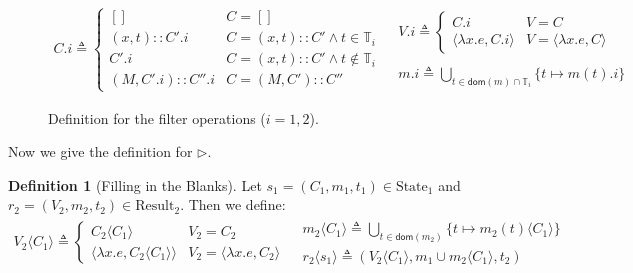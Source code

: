 \documentclass{article}
\theoremstyle{definition}
\newtheorem{definition}{Definition}[section]
\newcommand*{\cons}{::}
\newcommand*{\Time}{\mathbb{T}}
\newcommand*{\mem}{m}
\newcommand*{\State}{\text{State}}
\newcommand*{\Result}{\text{Result}}
\newcommand*{\inject}[2]{{#2}\langle{#1}\rangle}
\begin{document}
\begin{figure}[h!]
  \[
    \begin{array}{cc}
      C.i\triangleq
      \begin{cases}
        []                  & C=[]                                    \\
        (x,t)\cons C'.i     & C=(x,t)\cons C'\wedge t\in{\Time_i}     \\
        C'.i                & C=(x,t)\cons C'\wedge t\not\in{\Time_i} \\
        (M,C'.i)\cons C''.i & C=(M, C')\cons C''
      \end{cases} &
      \begin{array}{l}
        V.i\triangleq
        \begin{cases}
          C.i                           & V=C                           \\
          \langle\lambda x.e,C.i\rangle & V=\langle\lambda x.e,C\rangle
        \end{cases} \\ \\
        \mem.i\triangleq
        \displaystyle\bigcup_{t\in\mathsf{dom}(\mem)\cap\Time_i}\{t\mapsto \mem(t).i\}
      \end{array}
    \end{array}
  \]
  \caption{Definition for the filter operations ($i=1,2$).}
  \label{fig:concfilter}
\end{figure}

Now we give the definition for $\rhd$.
\begin{definition}[Filling in the Blanks]
  Let $s_1=(C_1,\mem_1,t_1)\in\State_1$ and $r_2=(V_2,\mem_2,t_2)\in\Result_2$. Then we define:
  \[
    \begin{array}{cc}
      \inject{C_1}{V_2}\triangleq
      \begin{cases}
        \inject{C_1}{C_2}                           & V_2=C_2                            \\
        \langle\lambda x.e,\inject{C_1}{C_2}\rangle & V_2=\langle\lambda x.e, C_2\rangle
      \end{cases} &
      \begin{array}{l}
        \inject{C_1}{\mem_2}\triangleq
        \displaystyle\bigcup_{t\in\mathsf{dom}(\mem_2)}\{t\mapsto\inject{C_1}{\mem_2(t)}\} \\
        \inject{s_1}{r_2}\triangleq
        (\inject{C_1}{V_2},\mem_1\cup\inject{C_1}{\mem_2},t_2)
      \end{array}
    \end{array}
  \]
\end{definition}
\end{document}
